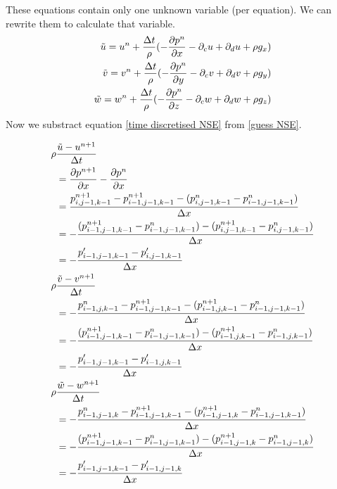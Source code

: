 \documentclass{article}
\begin{document}
These equations contain only one unknown variable (per equation). We can rewrite them to calculate that variable. 
\begin{equation}
  \begin{split}
  \tilde{u}=u^{n}+\frac{\Delta t}{\rho}(-\pdv{p^{n}}{x}-\partial _cu +\partial _du + \rho g_x)\\
  \tilde{v}=v^{n}+\frac{\Delta t}{\rho}(-\pdv{p^{n}}{y}-\partial _cv +\partial _dv + \rho g_y)\\
  \tilde{w}=w^{n}+\frac{\Delta t}{\rho}(-\pdv{p^{n}}{z}-\partial _cw +\partial _dw + \rho g_z)
  \end{split}\label{velocity tilde}
\end{equation} 
Now we substract equation \ref{time discretised NSE} from \ref{guess NSE}.

\begin{equation}
	\begin{split}
			\rho & \frac{\tilde{u} - u^{n+1}}{\Delta t} \\ &=
      \pdv{p^{n+1}}{x}-\pdv{p^{n}}{x}\\ &=
      \frac{p^{n+1}_{i,j-1,k-1}-p^{n+1}_{i-1,j-1,k-1}-(p^{n}_{i,j-1,k-1}- p^{n}_{i-1,j-1,k-1})}{\Delta x}\\
			&=-\frac{(p^{n+1}_{i-1,j-1,k-1}-p^{n}_{i-1,j-1,k-1})- 
			(p^{n+1}_{i,j-1,k-1}-p^{n}_{i,j-1,k-1})
		}{\Delta x}\\
			&=-\frac{p'_{i-1,j-1,k-1}-p'_{i,j-1,k-1}}{\Delta x}\\
\rho & \frac{\tilde{v} - v^{n+1}}{\Delta t} \\ &= - \frac{p^{n}_{i-1,j,k-1}- p^{n+1}_{i-1,j-1,k-1}-(p^{n+1}_{i-1,j,k-1}- p^{n}_{i-1,j-1,k-1})}{\Delta x}\\
			&=-\frac{(p^{n+1}_{i-1,j-1,k-1}-p^{n}_{i-1,j-1,k-1})- 
			(p^{n+1}_{i-1,j,k-1}-p^{n}_{i-1,j,k-1})
		}{\Delta x}\\
			&=-\frac{p'_{i-1,j-1,k-1}-p'_{i-1,j,k-1}}{\Delta x}\\
\rho & \frac{\tilde{w} - w^{n+1}}{\Delta t}  \\ &= - \frac{p^{n}_{i-1,j-1,k}- p^{n+1}_{i-1,j-1,k-1}-(p^{n+1}_{i-1,j-1,k}- p^{n}_{i-1,j-1,k-1})}{\Delta x}\\
			&=-\frac{(p^{n+1}_{i-1,j-1,k-1}-p^{n}_{i-1,j-1,k-1})-(p^{n+1}_{i-1,j-1,k}-p^{n}_{i-1,j-1,k})}{\Delta x}\\
			&=-\frac{p'_{i-1,j-1,k-1}-p'_{i-1,j-1,k}}{\Delta x}
\end{split}
\end{equation}
\end{document}
